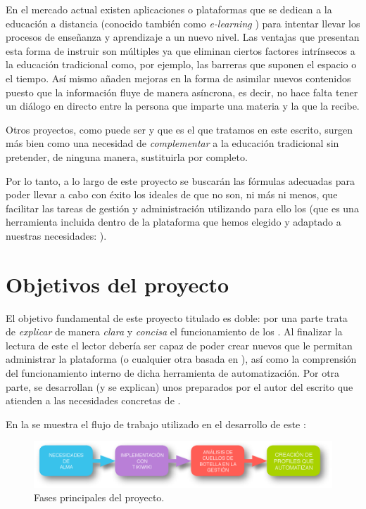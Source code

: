 En el mercado actual existen aplicaciones o plataformas que se dedican a la educación a distancia (conocido también como \textit{e-learning} \cite{web:elearning}) para intentar llevar los procesos de enseñanza y aprendizaje a un nuevo nivel. Las ventajas que presentan esta forma de instruir son múltiples ya que eliminan ciertos factores intrínsecos a la educación tradicional como, por ejemplo, las barreras que suponen el espacio o el tiempo. Así mismo añaden mejoras en la forma de asimilar nuevos contenidos puesto que la información fluye de manera asíncrona, es decir, no hace falta tener un diálogo en directo entre la persona que imparte una materia y la que la recibe.

Otros proyectos, como puede ser \alma{} y que es el que tratamos en este escrito, surgen más bien como una necesidad de \textit{complementar} a la educación tradicional sin pretender, de ninguna manera, sustituirla por completo.

Por lo tanto, a lo largo de este proyecto se buscarán las fórmulas adecuadas para poder llevar a cabo con éxito los ideales de \alma{} que no son, ni más ni menos, que facilitar las tareas de gestión y administración utilizando para ello los \profiles{} \cite{web:explicacion-profiles} (que es una herramienta incluida dentro de la plataforma que hemos elegido y adaptado a nuestras necesidades: \tiki{} \cite{web:tikiwiki}).

\section{Objetivos del proyecto}

El objetivo fundamental de este proyecto titulado  es doble: por una parte trata de \textit{explicar} de manera \textit{clara} y \textit{concisa} el funcionamiento de los \profiles{}. Al finalizar la lectura de este \pfc{} el lector debería ser capaz de poder crear nuevos \profiles{} que le permitan administrar la plataforma \alma{} (o cualquier otra basada en \tiki{}), así como la comprensión del funcionamiento interno de dicha herramienta de automatización. Por otra parte, se desarrollan (y se explican) unos \profiles{} preparados por el autor del escrito que atienden a las necesidades concretas de \alma{}.

En la  se muestra el flujo de trabajo utilizado en el desarrollo de este \pfc{}:

\begin{figure}[htp]
\centering
\includegraphics[width=\linewidth]{../graphics/flujo_del_pfc.eps}
\caption{Fases principales del proyecto.}\label{fig:flujo_trabajo}
\end{figure}

